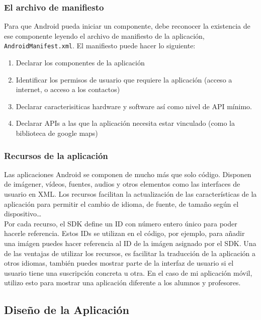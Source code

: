 \subsubsection{El archivo de manifiesto}

Para que Android pueda iniciar un componente, debe reconocer la existencia de ese componente leyendo el archivo de manifiesto de la aplicación, \verb|AndroidManifest.xml|. El manifiesto puede hacer lo siguiente:
\begin{enumerate}
    \item Declarar los componentes de la aplicación
    \item Identificar los permisos de usuario que requiere la aplicación (acceso a internet, o acceso a los contactos)
    \item Declarar caracterisiticas hardware y software así como nivel de API mínimo.
    \item Declarar APIs a las que la aplicación necesita estar vinculado (como la biblioteca de google maps)
\end{enumerate}

\subsubsection{Recursos de la aplicación}

Las aplicaciones Android se componen de mucho más que solo código. Disponen de imágener, vídeos, fuentes, audios y otros elementos como las interfaces de usuario en XML. Los recursos facilitan la actualización de las características de la aplicación para permitir el cambio de idioma, de fuente, de tamaño según el dispositivo\dots \\

Por cada recurso, el SDK define un ID con número entero único para poder hacerle referencia. Estos IDs se utilizan en el código, por ejemplo, para añadir una imágen puedes hacer referencia al ID de la imágen asignado por el SDK. Una de las ventajas de utilizar los recursos, es facilitar la traducción de la aplicación a otros idiomas, también puedes mostrar parte de la interfaz de usuario si el usuario tiene una suscripción concreta u otra. En el caso de mi aplicación móvil, utilizo esto para mostrar una aplicación diferente  a los alumnos y profesores.

\clearpage
\subsection{Diseño de la Aplicación}

